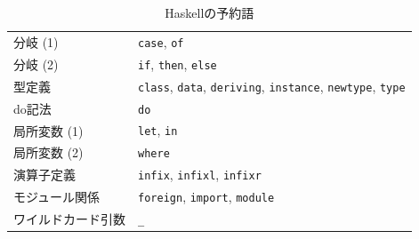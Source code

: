 \documentclass[a5paper,twoside,fleqn]{jsbook}
\newcommand{\programminglanguage}[1]{\textsf{#1}}
\newcommand{\haskell}{\programminglanguage{Haskell}}
\newcommand{\code}[1]{\texttt{#1}}
\begin{document}

\begin{table}
\caption{\haskell の予約語}
\label{tab:reserved-keywords}
\begin{center}
\begin{tabular}{||l|l||}
\hline
分岐 (1)&\code{case}, \code{of}\\
分岐 (2)&\code{if}, \code{then}, \code{else}\\
型定義&\code{class}, \code{data}, \code{deriving}, \code{instance}, \code{newtype}, \code{type}\\
do記法&\code{do}\\
局所変数 (1)&\code{let}, \code{in}\\
局所変数 (2)&\code{where}\\
演算子定義&\code{infix}, \code{infixl}, \code{infixr}\\
モジュール関係&\code{foreign}, \code{import}, \code{module}\\
ワイルドカード引数&\code{\_}\\
\hline
\end{tabular}
\end{center}
\end{table}

\end{document}
